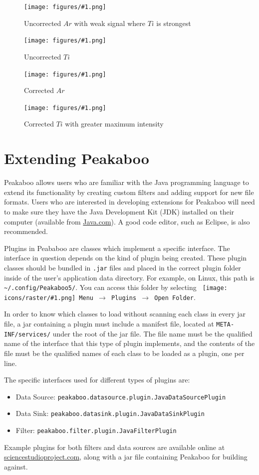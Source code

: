 \documentclass[article,twoside,11pt]{report}
\newcommand{\command}[1]{\texttt{#1}}
\newcommand{\icon}[1]{\texttt{[image: icons/raster/\#1.png]}}
\newcommand{\button}[2]{\ \command{\icon{#1} #2}}
\newcommand{\menu}[0]{$\rightarrow$}
\newcommand{\file}[1]{\command{#1}}
\newcommand{\code}[1]{\command{#1}}
\newcommand{\class}[1]{{\color{violet} \code{#1}}}
\newcommand{\element}[1]{$#1$}
\newcommand{\screenshot}[2]{%
\begin{figure}[h!]
\centering\texttt{[image: figures/\#1.png]}
\caption{#2}
\end{figure}
}
\newcommand{\tocchapter}[1]{\cleardoublepage\chapter*{#1}\addcontentsline{toc}{chapter}{#1}}
\begin{document}
\clearpage
\screenshot{normalize-uncorrected-ar}{Uncorrected \element{Ar} with weak signal where \element{Ti} is strongest}
\screenshot{normalize-uncorrected-ti}{Uncorrected \element{Ti}}
\screenshot{normalize-corrected-ar}{Corrected \element{Ar}}
\screenshot{normalize-corrected-ti}{Corrected \element{Ti} with greater maximum intensity}

\tocchapter{Extending Peakaboo}

Peakaboo allows users who are familiar with the Java programming language to extend its functionality by
creating custom filters and adding support for new file formats. Users who are interested in
developing extensions for Peakaboo will need to make sure they have the Java Development Kit (JDK)
installed on their computer (available from \href{http://java.com}{Java.com}). A good code editor,
such as Eclipse, is also recommended. 

Plugins in Peababoo are classes which implement a specific interface. The interface in question 
depends on the kind of plugin being created. These plugin classes should be bundled in \file{.jar} files
and placed in the correct plugin folder inside of the user's application data directory. For example, 
on Linux, this path is \file{\textasciitilde/.config/Peakaboo5/}. You can access this folder by selecting
\command{\button{main-menu}{Menu} \menu\ Plugins \menu\ Open Folder}.

In order to know which classes to load without scanning each class in every jar file, a jar 
containing a plugin must include a manifest file, located at \file{META-INF/services/} under
the root of the jar file. The file name must be the qualified name of the interface that this type
of plugin implements, and the contents of the file must be the qualified names of each class to be 
loaded as a plugin, one per line.

The specific interfaces used for different types of plugins are:
\begin{itemize}  
\item Data Source: \class{peakaboo.datasource.plugin.JavaDataSourcePlugin}
\item Data Sink: \class{peakaboo.datasink.plugin.JavaDataSinkPlugin}
\item Filter: \class{peakaboo.filter.plugin.JavaFilterPlugin}
\end{itemize}

Example plugins for both filters and data sources are available online at 
\href{http://sciencestudioproject.com/}{sciencestudioproject.com}, along with a jar file 
containing Peakaboo for building against.
\end{document}
